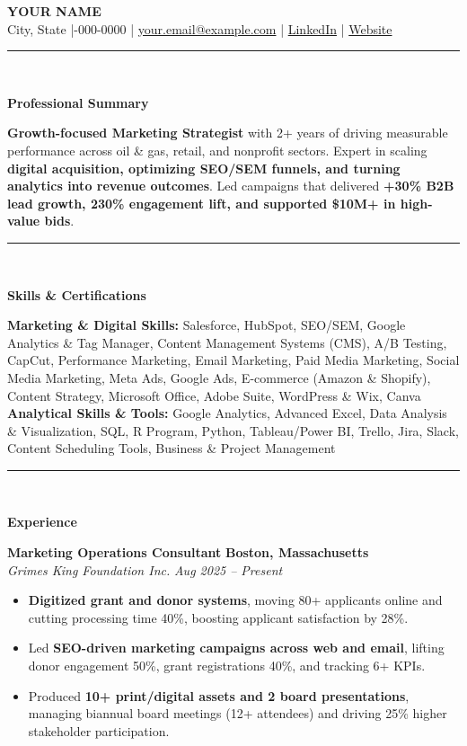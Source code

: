 \documentclass[10pt]{extarticle}
\newcommand{\sectiontitle}[1]{%
  \vspace{-4pt}
  \rule{\linewidth}{1.4pt}\\[-18pt]
  \begin{center}
    {\large \textbf{#1}}\\[-6pt]
  \end{center}
  \vspace{-5pt}
}
\newcommand{\skillbreak}{\\}
\newcommand{\job}[4]{%
  \textbf{#1} \hfill \textbf{#3}\\%
  \textit{#2} \hfill \textit{#4}\par%
  \vspace{-3pt}%
}
\begin{document}
\begin{center}
{\Large \textbf{YOUR NAME}}\\[-1pt]
City, State \;|-000-0000 \;|\;
\href{mailto:your.email@example.com}{your.email@example.com} \;|\;
\href{https://www.linkedin.com/in/yourprofile/}{LinkedIn} \;|\;
\href{https://yourwebsite.com}{Website}
\end{center}
\vspace{-9pt}

\sectiontitle{Professional Summary}
\textbf{Growth-focused Marketing Strategist} with 2+ years of driving measurable performance across oil \& gas, retail, and nonprofit sectors.
Expert in scaling \textbf{digital acquisition, optimizing SEO/SEM funnels, and turning analytics into revenue outcomes}. Led campaigns that delivered \textbf{+30\% B2B lead growth, 230\% engagement lift, and supported \$10M+ in high-value bids}.

\sectiontitle{Skills \& Certifications}
\textbf{Marketing \& Digital Skills:} Salesforce, HubSpot, SEO/SEM, Google Analytics \& Tag Manager, Content Management Systems (CMS), A/B Testing, CapCut, Performance Marketing, Email Marketing, Paid Media Marketing, Social Media Marketing, Meta Ads, Google Ads, E-commerce (Amazon \& Shopify), Content Strategy, Microsoft Office, Adobe Suite, WordPress \& Wix, Canva\skillbreak
\textbf{Analytical Skills \& Tools:} Google Analytics, Advanced Excel, Data Analysis \& Visualization, SQL, R Program, Python, Tableau/Power BI, Trello, Jira, Slack, Content Scheduling Tools, Business \& Project Management

\sectiontitle{Experience}

\job{Marketing Operations Consultant}
{Grimes King Foundation Inc.}
{Boston, Massachusetts}
{Aug 2025 -- Present}
\begin{itemize}
  \item \textbf{Digitized grant and donor systems}, moving 80+ applicants online and cutting processing time 40\%, boosting applicant satisfaction by 28\%.
  \item Led \textbf{SEO-driven marketing campaigns across web and email}, lifting donor engagement 50\%, grant registrations 40\%, and tracking 6+ KPIs.
  \item Produced \textbf{10+ print/digital assets and 2 board presentations}, managing biannual board meetings (12+ attendees) and driving 25\% higher stakeholder participation.
\end{itemize}
\end{document}
